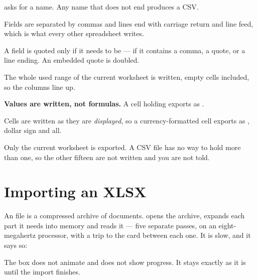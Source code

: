  asks for a name. Any name that does not end  produces a
CSV.

\begin{ccsteps}
\item Fields are separated by commas and lines end with carriage return and
line feed, which is what every other spreadsheet writes.
\item A field is quoted only if it needs to be --- if it contains a comma, a
quote, or a line ending. An embedded quote is doubled.
\item The whole used range of the current worksheet is written, empty cells
included, so the columns line up.
\item \textbf{Values are written, not formulas.} A cell holding
 exports as .
\item Cells are written as they are \emph{displayed}, so a currency-formatted
cell exports as , dollar sign and all.
\end{ccsteps}

\begin{ccnote}
Only the current worksheet is exported. A CSV file has no way to hold more than
one, so the other fifteen are not written and you are not told.
\end{ccnote}

\section{Importing an XLSX}

An  file is a compressed archive of documents. \ccprod{} opens the
archive, expands each part it needs into memory and reads it --- five separate
passes, on an eight-megahertz processor, with a trip to the card between each
one. It is slow, and it says so:

\begin{ccfigure}
\caption{The busy box shown throughout an import}
\label{fig:busybox}
\end{ccfigure}

The box does not animate and does not show progress. It stays exactly as it is
until the import finishes.

